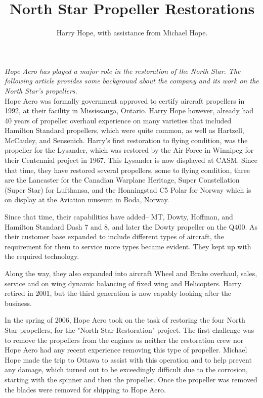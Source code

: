 %


\title{North Star Propeller Restorations}
\author{Harry Hope, with assistance from Michael Hope.}

\maketitle

\textit{Hope Aero has played a major role in the restoration of the North Star.
The following article provides some background about the company and its work
on the North Star’s propellers. }\\

Hope Aero was formally government approved to certify aircraft propellers in
1992, at their facility in Mississauga, Ontario. Harry Hope however, already
had 40 years of propeller overhaul experience on many varieties that included
Hamilton Standard propellers, which were quite common, as well as Hartzell,
McCauley, and Sensenich. Harry's first restoration to flying condition, was the
propeller for the Lysander, which was restored by the Air Force in Winnipeg for
their Centennial project in 1967. This Lysander is now displayed at CASM. Since
that time, they have restored several propellers, some to flying condition,
three are the Lancaster for the Canadian Warplane Heritage, Super Constellation
(Super Star) for Lufthansa, and the Honningstad C5 Polar for Norway which is on
display at the Aviation museum in Boda, Norway. 

 Since that time, their capabilities have added– MT, Dowty, Hoffman, and
Hamilton Standard Dash 7 and 8, and later the Dowty propeller on the Q400.  As
their customer base expanded to include different types of aircraft, the
requirement for them to service more types became evident. They kept up with
the required technology.  

Along the way, they also expanded into aircraft Wheel and Brake overhaul,
sales, service and on wing dynamic balancing of fixed wing and Helicopters.
Harry retired in 2001, but the third generation is now capably looking after
the business.

In the spring of 2006, Hope Aero took on the task of restoring the four North
Star propellers, for the "North Star Restoration" project. The first challenge
was to remove the propellers from the engines as neither the restoration crew
nor Hope Aero had any recent experience removing this type of propeller.
Michael Hope made the trip to Ottawa to assist with this operation and to help
prevent any damage, which turned out to be exceedingly difficult due to the
corrosion, starting with the spinner and then the propeller. Once the propeller
was removed the blades were removed for shipping to Hope Aero. 


